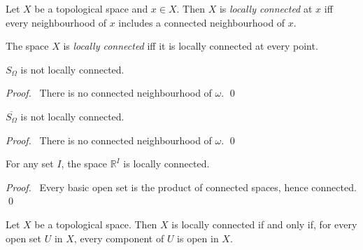 \begin{df}
  Let $X$ be a topological space and $x \in X$. Then $X$ is \emph{locally
    connected} at $x$ iff every neighbourhood of $x$ includes a connected
  neighbourhood of $x$.

  The space $X$ is \emph{locally connected} iff it is locally connected at
  every point.
\end{df}

 \begin{prop}
$S_\Omega$ is not locally connected.
\end{prop}

\begin{proof}
\pf\ There is no connected neighbourhood of $\omega$. \qed
\end{proof}

   \begin{prop}
   $\overline{S_\Omega}$ is not locally connected.
\end{prop}

\begin{proof}
\pf\ There is no connected neighbourhood of $\omega$. \qed
\end{proof}

\begin{prop}
  For any set $I$,
  the space $\mathbb{R}^I$ is locally connected.
\end{prop}

\begin{proof}
  \pf\ Every basic open set is the product of connected spaces, hence
  connected. \qed
\end{proof}

\begin{prop}
  Let $X$ be a topological space. Then $X$ is locally connected if and only
  if, for every open set $U$ in $X$, every component of $U$ is open in $X$.
\end{prop}

